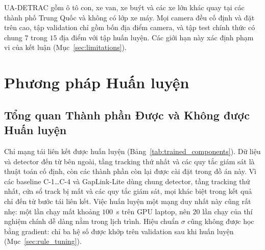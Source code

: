 UA-DETRAC gồm ô tô con, xe van, xe buýt và các xe lớn khác quay tại các thành phố Trung Quốc và không có lớp xe máy. Mọi camera đều cố định và đặt trên cao, tập validation chỉ gồm bốn địa điểm camera, và tập test chính thức có chung $7$ trong $15$ địa điểm với tập huấn luyện. Các giới hạn này xác định phạm vi của kết luận (Mục~\ref{sec:limitations}).

\section{Phương pháp Huấn luyện}
\label{sec:training_methodology}

\subsection{Tổng quan Thành phần Được và Không được Huấn luyện}
\label{sec:trained_components}

Chỉ mạng tái liên kết được huấn luyện (Bảng~\ref{tab:trained_components}). Dữ liệu và detector đến từ bên ngoài, tầng tracking thứ nhất và các quy tắc giám sát là thuật toán cố định, còn các thành phần còn lại được cài đặt trong đồ án này. Vì các baseline C-1\dots C-4 và GapLink-Lite dùng chung detector, tầng tracking thứ nhất, cửa sổ track bị mất và các quy tắc giám sát, mọi khác biệt trong kết quả chỉ đến từ bước tái liên kết. Việc huấn luyện một mạng duy nhất này cũng rất nhẹ: một lần chạy mất khoảng $100$~s trên GPU laptop, nên $20$ lần chạy của thí nghiệm chính dễ dàng nằm trong lịch trình. Hiệu chuẩn $\sigma$ cũng không được học bằng gradient: chỉ ba hệ số được khớp trên validation sau khi huấn luyện (Mục~\ref{sec:rule_tuning}).

